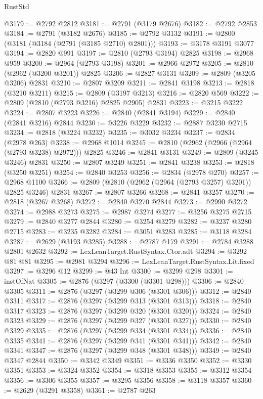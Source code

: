 \begin{lexlean}{RustStd}
\begin{coremodule}
@3179 := @2792 @2812
@3181 := @2791 (@3179 @2676)
@3182 := @2792 @2853
@3184 := @2791 (@3182 @2676)
@3185 := @2792 @3132
@3191 := @2800 (@3181 (@3184 (@2791 (@3185 @2710) @2801)))
@3193 := @3178 @3191 @3077
@3194 := @2820 @991
@3197 := @2810 (@2793 @3194) @2825
@3198 := @2968 @959
@3200 := @2964 (@2793 @3198)
@3201 := @2966 @2972
@3205 := @2810 (@2962 (@3200 @3201)) @2825
@3206 := @2827 @3131
@3209 := @2809 (@3205 @3206) @2831
@3210 := @2807 @3209
@3211 := @2841 @3198
@3213 := @2818 (@3210 @3211)
@3215 := @2809 (@3197 @3213)
@3216 := @2820 @569
@3222 := @2809 (@2810 (@2793 @3216) @2825 @2905) @2831
@3223 := @3215 @3222
@3224 := @2807 @3223
@3226 := @2840 (@2841 @3194)
@3229 := @2840 (@2841 @3216) @2844
@3230 := @3226 @3229
@3232 := @2887 @3230 @2715
@3234 := @2818 (@3224 @3232)
@3235 := @3032 @3234
@3237 := @2834 (@2978 @263)
@3238 := @2968 @1014
@3245 := @2810 (@2962 (@2966 (@2964 (@2793 @3238) @2972))) @2825
@3246 := @2841 @3131
@3249 := @2809 (@3245 @3246) @2831
@3250 := @2807 @3249
@3251 := @2841 @3238
@3253 := @2818 (@3250 @3251)
@3254 := @2840 @3253
@3256 := @2834 (@2978 @270)
@3257 := @2968 @1100
@3266 := @2809 (@2810 (@2962 (@2964 (@2793 @3257) @3201)) @2825 @3246) @2831
@3267 := @2807 @3266
@3268 := @2841 @3257
@3270 := @2818 (@3267 @3268)
@3272 := @2840 @3270 @2844
@3273 := @2990 @3272
@3274 := @2988 @3273
@3275 := @2987 @3274
@3277 := @3256 @3275 @2715
@3279 := @2840 @3277 @2844
@3280 := @3254 @3279
@3282 := @3237 @3280 @2715
@3283 := @3235 @3282
@3284 := @3051 @3283
@3285 := @3118 @3284
@3287 := @2629 (@3193 @3285)
@3288 := @2787 @179
@3291 := @2784 @3288 @2801 @2632
@3292 := LexLeanTarget.RustSyntax.Ctor.adt
@3294 := @3292 @81 @81
@3295 := @2981 @3294
@3296 := LexLeanTarget.RustSyntax.Lit.fixed
@3297 := @3296 @12
@3299 := @43 Int
@3300 := @3299 @298
@3301 := instOfNat
@3305 := @2876 (@3297 (@3300 (@3301 @298)))
@3306 := @2840 @3305
@3311 := @2876 (@3297 (@3299 @306 (@3301 @306)))
@3312 := @2840 @3311
@3317 := @2876 (@3297 (@3299 @313 (@3301 @313)))
@3318 := @2840 @3317
@3323 := @2876 (@3297 (@3299 @320 (@3301 @320)))
@3324 := @2840 @3323
@3329 := @2876 (@3297 (@3299 @327 (@3301 @327)))
@3330 := @2840 @3329
@3335 := @2876 (@3297 (@3299 @334 (@3301 @334)))
@3336 := @2840 @3335
@3341 := @2876 (@3297 (@3299 @341 (@3301 @341)))
@3342 := @2840 @3341
@3347 := @2876 (@3297 (@3299 @348 (@3301 @348)))
@3349 := @2840 @3347 @2844
@3350 := @3342 @3349
@3351 := @3336 @3350
@3352 := @3330 @3351
@3353 := @3324 @3352
@3354 := @3318 @3353
@3355 := @3312 @3354
@3356 := @3306 @3355
@3357 := @3295 @3356
@3358 := @3118 @3357
@3360 := @2629 (@3291 @3358)
@3361 := @2787 @263

\end{coremodule}
\end{lexlean}
